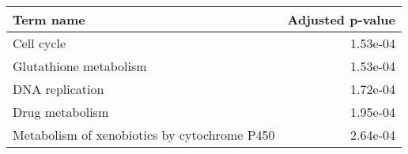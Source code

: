 \begin{tabular}{lr}
\toprule
                                    Term name &  Adjusted p-value \\
\midrule
                                   Cell cycle &          1.53e-04 \\
                       Glutathione metabolism &          1.53e-04 \\
                              DNA replication &          1.72e-04 \\
                              Drug metabolism &          1.95e-04 \\
 Metabolism of xenobiotics by cytochrome P450 &          2.64e-04 \\
\bottomrule
\end{tabular}

